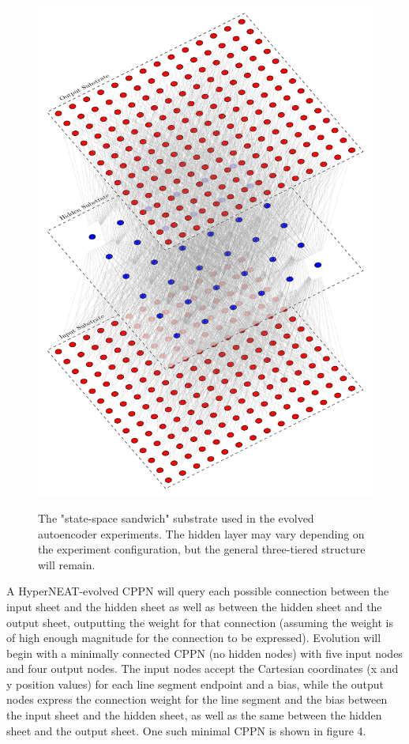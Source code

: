 \documentclass{acm_proc_article-sp}
\begin{document}
\begin{figure}[h]
	\caption{The "state-space sandwich" substrate used in the evolved autoencoder experiments.  The hidden layer may vary depending on the experiment configuration, but the general three-tiered structure will remain.}
	\centering
	\includegraphics[scale=0.55]{SubstrateConfiguration/AutoencoderSubstrate}
	\label{figure:autoencodersubstrate}
\end{figure}

A HyperNEAT-evolved CPPN will query each possible connection between the input sheet and the hidden sheet as well as between the hidden sheet and the output sheet, outputting the weight for that connection (assuming the weight is of high enough magnitude for the connection to be expressed).  Evolution will begin with a minimally connected CPPN (no hidden nodes) with five input nodes and four output nodes.  The input nodes accept the Cartesian coordinates (x and y position values) for each line segment endpoint and a bias, while the output nodes express the connection weight for the line segment and the bias between the input sheet and the hidden sheet, as well as the same between the hidden sheet and the output sheet.  One such minimal CPPN is shown in figure 4.
\end{document}
